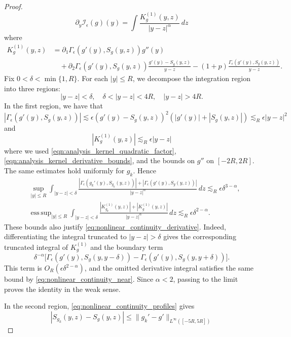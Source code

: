 \documentclass[11pt]{amsart}
\theoremstyle{definition}
\theoremstyle{remark}
\numberwithin{equation}{section}
\newcommand{\mc}[1]{\mathcal{#1}}
\begin{document}
\begin{proof}
\begin{equation}
        \partial_y \mc{I}_\epsilon(g)(y) = \int \frac{K_g^{(1)}(y, z)}{|y-z|^\alpha}\,dz
    \end{equation}
    where 
    \[\begin{aligned}
        K_g^{(1)}(y, z) & = \partial_1\Gamma_\epsilon(g'(y), S_g(y, z))g''(y)\\
        &\quad + \partial_2\Gamma_\epsilon(g'(y), S_g(y, z)) \frac{g'(y) - S_g(y, z)}{y - z}
        - (1 + p)\frac{\Gamma_\epsilon(g'(y), S_g(y, z))}{y - z}.
    \end{aligned}\]
    Fix $0<\delta<\min\{1,R\}$. For each $|y|\le R$, we decompose the integration region into three regions: 
    \[|y - z| < \delta, \quad \delta < |y - z| < 4R, \quad |y - z| > 4R.\]
    In the first region, we have that 
    \[|\Gamma_\epsilon(g'(y), S_g(y, z))| \lesssim \epsilon (g'(y) - S_g(y, z))^2(|g'(y)| + |S_g(y, z)|) \lesssim_R \epsilon |y - z|^2\]
    and 
    \[|K_g^{(1)}(y, z)| \lesssim_R \epsilon |y - z|\]
    where we used \eqref{eqn:analysis_kernel_quadratic_factor}, \eqref{eqn:analysis_kernel_derivative_bounds}, and the bounds on $g''$ on $[-2R,2R]$. The same estimates hold uniformly for $g_k$. Hence
    \begin{equation}\label{eq:nonlinear_continuity_near}
    \begin{aligned}
        &\sup_{|y|\le R}\int_{|y-z|<\delta}
        \frac{|\Gamma_\epsilon(g_k'(y),S_{g_k}(y,z))|+|\Gamma_\epsilon(g'(y),S_g(y,z))|}{|y-z|^\alpha}\,dz
        \lesssim_R\epsilon\delta^{3-\alpha},\\
        &\mathop{\mathrm{ess\,sup}}_{|y|\le R}\int_{|y-z|<\delta}
        \frac{|K_{g_k}^{(1)}(y,z)|+|K_g^{(1)}(y,z)|}{|y-z|^\alpha}\,dz
        \lesssim_R\epsilon\delta^{2-\alpha}.
    \end{aligned}
    \end{equation}
    These bounds also justify \eqref{eq:nonlinear_continuity_derivative}. Indeed, differentiating the integral truncated to $|y-z|>\delta$ gives the corresponding truncated integral of $K_g^{(1)}$ and the boundary term
    \[\delta^{-\alpha}\bigl[\Gamma_\epsilon(g'(y),S_g(y,y-\delta))-\Gamma_\epsilon(g'(y),S_g(y,y+\delta))\bigr].\]
    This term is $O_R(\epsilon\delta^{2-\alpha})$, and the omitted derivative integral satisfies the same bound by \eqref{eq:nonlinear_continuity_near}. Since $\alpha<2$, passing to the limit proves the identity in the weak sense. \par
    In the second region, \eqref{eq:nonlinear_continuity_profiles} gives 
    \[|S_{g_k}(y, z) - S_g(y, z)| \le \|g_k' - g'\|_{L^\infty([-5R,5R])}\]

\end{proof}
\end{document}
